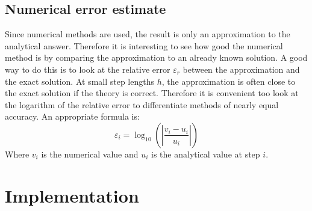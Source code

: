 \documentclass[twoside,twocolumn]{article}
\begin{document}
\subsection{Numerical error estimate}
Since numerical methods are used, the result is only an approximation to the analytical answer.
Therefore it is interesting to see how good the numerical method is by comparing the approximation to an already known solution.    
A good way to do this is to look at the relative error $\varepsilon_r$ between the approximation and the exact solution. At small step lengths $h$, the approximation is often close to the exact solution if the theory is correct. Therefore it is convenient too look at the logarithm of the relative error to differentiate methods of nearly equal accuracy. An appropriate formula is:
\begin{equation}
\varepsilon_i = \log_{10}\left(\left|\frac{v_i - u_i}{u_i}\right|\right)\label{eq:num_err}
\end{equation}
Where $v_i$ is the numerical value and $u_i$ is the analytical value at step $i$.

\newpage

\section{Implementation}
\end{document}
